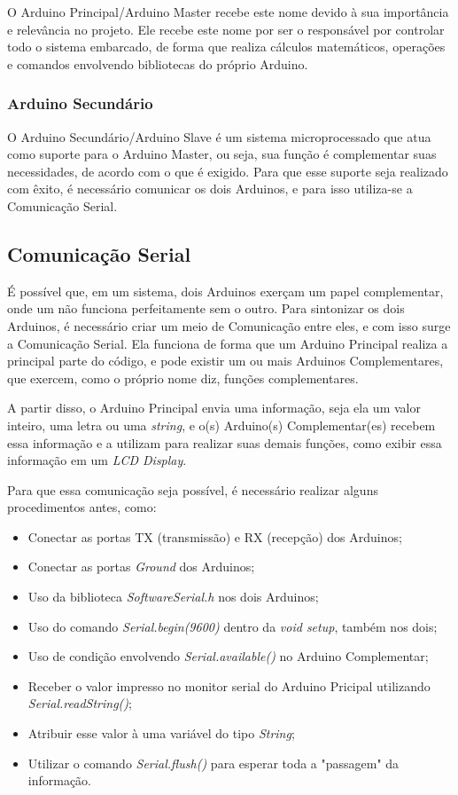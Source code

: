 \documentclass[conference]{IEEEtran}
\begin{document}
    O Arduino Principal/Arduino Master recebe este nome devido à sua importância e relevância no projeto.
Ele recebe este nome por ser o responsável por controlar todo o sistema embarcado, de forma que realiza
cálculos matemáticos, operações e comandos envolvendo bibliotecas do próprio Arduino.

\subsubsection{Arduino Secundário}

    O Arduino Secundário/Arduino Slave é um sistema microprocessado que atua como suporte para o 
Arduino Master, ou seja, sua função é complementar suas necessidades, de acordo com o que é exigido.
Para que esse suporte seja realizado com êxito, é necessário comunicar os dois Arduinos, e para isso
utiliza-se a Comunicação Serial.

\subsection{Comunicação Serial}

    É possível que, em um sistema, dois Arduinos exerçam um papel complementar, onde um não funciona
perfeitamente sem o outro. Para sintonizar os dois Arduinos, é necessário criar um meio de Comunicação
entre eles, e com isso surge a Comunicação Serial. Ela funciona de forma que um Arduino Principal realiza
a principal parte do código, e pode existir um ou mais Arduinos Complementares, que exercem, como o próprio
nome diz, funções complementares.

    A partir disso, o Arduino Principal envia uma informação, seja ela um valor inteiro, uma letra ou uma
\emph{string}, e o(s) Arduino(s) Complementar(es) recebem essa informação e a utilizam para realizar suas
demais funções, como exibir essa informação em um \emph{LCD Display}. 

    Para que essa comunicação seja possível, é necessário realizar alguns procedimentos antes, como:
    \begin{itemize}
        \item Conectar as portas TX (transmissão) e RX (recepção) dos Arduinos;
        \item Conectar as portas \emph{Ground} dos Arduinos;
        \item Uso da biblioteca \emph{SoftwareSerial.h} nos dois Arduinos;
        \item Uso do comando \emph{Serial.begin(9600)} dentro da \emph{void setup}, também nos dois;
        \item Uso de condição envolvendo \emph{Serial.available()} no Arduino Complementar;
        \item Receber o valor impresso no monitor serial do Arduino Pricipal utilizando 
        \emph{Serial.readString()};
        \item Atribuir esse valor à uma variável do tipo \emph{String};
        \item Utilizar o comando \emph{Serial.flush()} para esperar toda a "passagem" da informação.
    \end{itemize}
\end{document}
